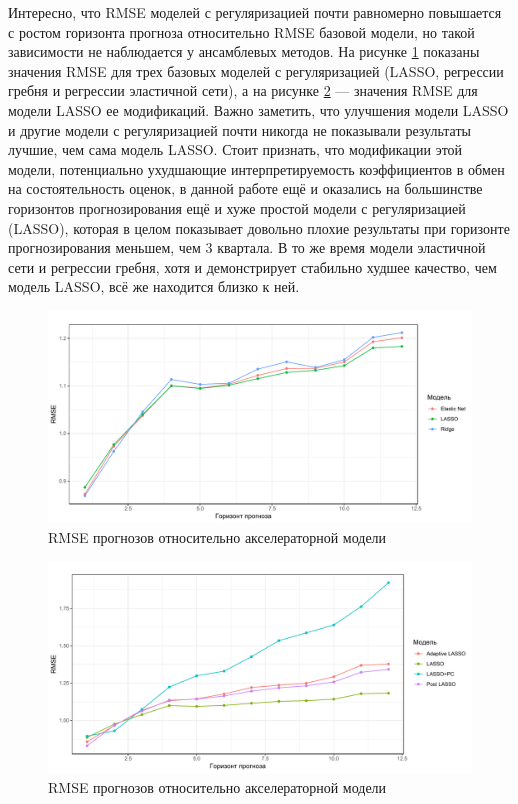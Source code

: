 Интересно, что RMSE моделей с регуляризацией почти равномерно повышается с ростом горизонта прогноза относительно RMSE базовой модели, но такой зависимости не наблюдается у ансамблевых методов. На рисунке \ref{fig:rmse1} показаны значения RMSE для трех базовых моделей с регуляризацией (LASSO, регрессии гребня и регрессии эластичной сети), а на рисунке \ref{fig:rmse2} --- значения RMSE для модели LASSO ее модификаций. Важно заметить, что улучшения модели LASSO и другие модели с регуляризацией почти никогда не показывали результаты лучшие, чем сама модель LASSO. Стоит признать, что модификации этой модели, потенциально ухудшающие интерпретируемость коэффициентов в обмен на состоятельность оценок, в данной работе ещё и оказались на большинстве горизонтов прогнозирования ещё и хуже простой модели с регуляризацией (LASSO), которая в целом показывает довольно плохие результаты при горизонте прогнозирования меньшем, чем 3 квартала.  В то же время модели эластичной сети и регрессии гребня, хотя и демонстрирует стабильно худшее качество, чем модель LASSO, всё же находится близко к ней.

\begin{figure}[hp]
    \centering
    \includegraphics[width = \textwidth]{rmse1.pdf}
    \caption{RMSE прогнозов относительно акселераторной модели}
    \label{fig:rmse1}
\end{figure}


\begin{figure}[hp]
    \centering
    \includegraphics[width = \textwidth]{rmse2.pdf}
    \caption{RMSE прогнозов относительно акселераторной модели}
    \label{fig:rmse2}
\end{figure}

